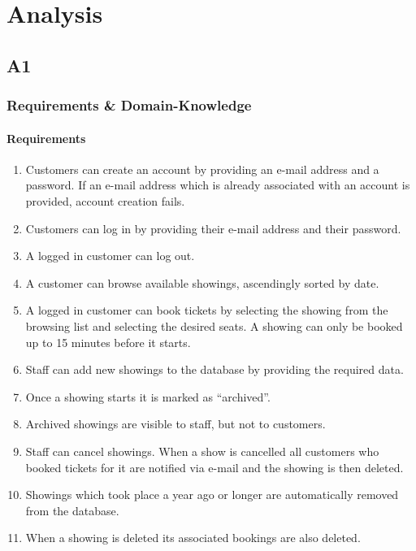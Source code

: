 \documentclass[a4paper,10pt,titlepage,bibtotoc,bibtotocnumbered]{scrreprt}
\begin{document}
\tableofcontents
\listoffigures

\chapter{Analysis}
\section{A1}

\subsection{Requirements \& Domain-Knowledge}

\subsubsection{Requirements}
\begin{enumerate}[R1]
	\item\label{enum:R1} Customers can create an account by providing an e-mail address and a password. If an e-mail address which is already associated with an account is provided, account creation fails.
    \item Customers can log in by providing their e-mail address and their password.
    \item A logged in customer can log out.
    \item A customer can browse available showings, ascendingly sorted by date.
    \item\label{enum:R5} A logged in customer can book tickets by selecting the showing from the browsing list and selecting the desired seats. A showing can only be booked up to 15 minutes before it starts.
    \item Staff can add new showings to the database by providing the required data.
    \item Once a showing starts it is marked as \enquote{archived}.
    \item Archived showings are visible to staff, but not to customers.
    \item Staff can cancel showings. When a show is cancelled all customers who booked tickets for it are notified via e-mail and the showing is then deleted.
    \item Showings which took place a year ago or longer are automatically removed from the database.
    \item When a showing is deleted its associated bookings are also deleted.

\end{enumerate}
\end{document}
